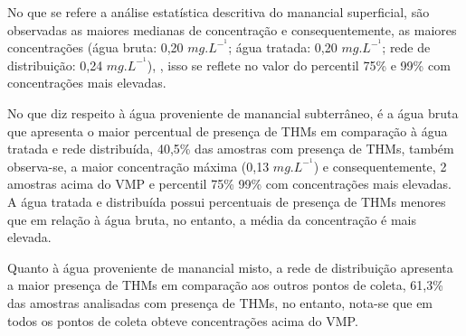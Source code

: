 No que se refere a análise estatística descritiva do manancial superficial, são observadas as maiores medianas de concentração e consequentemente, as maiores concentrações (água bruta: 0,20 $mg.L^-^1$; água tratada: 0,20 $mg.L^-^1$; rede de distribuição: 0,24 $mg.L^-^1$), , isso se reflete no valor do percentil 75\% e 99\% com concentrações mais elevadas. 

No que diz respeito à água proveniente de manancial subterrâneo, é a água bruta que apresenta o maior percentual de presença de THMs em comparação à água tratada e rede distribuída, 40,5\% das amostras com presença de THMs, também observa-se, a maior concentração máxima (0,13 $mg.L^-^1$) e consequentemente, 2 amostras acima do VMP e percentil 75\% 99\% com concentrações mais elevadas. A água tratada e distribuída possui percentuais de presença de THMs menores que em relação à água bruta, no entanto, a média da concentração é mais elevada. 

Quanto à água proveniente de manancial misto, a rede de distribuição apresenta a maior presença de THMs em comparação aos outros pontos de coleta, 61,3\% das amostras analisadas com presença de THMs, no entanto, nota-se que em todos os pontos de coleta obteve concentrações acima do VMP.


